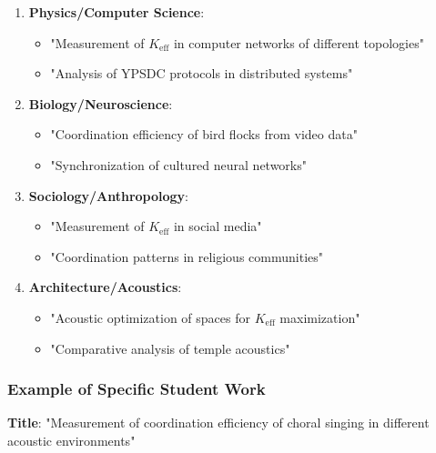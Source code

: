 \documentclass[12pt,a4paper]{article}
\begin{document}
	\begin{enumerate}
		\item \textbf{Physics/Computer Science}:
		\begin{itemize}
			\item "Measurement of $K_{\mathrm{eff}}$ in computer networks of different topologies"
			\item "Analysis of YPSDC protocols in distributed systems"
		\end{itemize}
		
		\item \textbf{Biology/Neuroscience}:
		\begin{itemize}
			\item "Coordination efficiency of bird flocks from video data"
			\item "Synchronization of cultured neural networks"
		\end{itemize}
		
		\item \textbf{Sociology/Anthropology}:
		\begin{itemize}
			\item "Measurement of $K_{\mathrm{eff}}$ in social media"
			\item "Coordination patterns in religious communities"
		\end{itemize}
		
		\item \textbf{Architecture/Acoustics}:
		\begin{itemize}
			\item "Acoustic optimization of spaces for $K_{\mathrm{eff}}$ maximization"
			\item "Comparative analysis of temple acoustics"
		\end{itemize}
	\end{enumerate}
	
	\subsubsection{Example of Specific Student Work}
	
	\textbf{Title}: "Measurement of coordination efficiency of choral singing in different acoustic environments"
	
\end{document}
